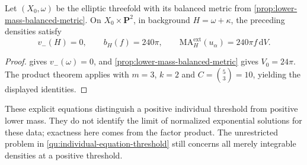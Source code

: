 \begin{corollary}\label{cor:elliptic-fivefold-exact-threshold}
Let $(X_0,\omega)$ be the elliptic threefold with its balanced metric from \cref{prop:lower-mass-balanced-metric}. On $X_0\times\mathbf P^2$, in background $H=\omega+\kappa$, the preceding densities satisfy
\[
 v_-(H)=0,\qquad b_H(f)=240\pi,
 \qquad\mathrm{MA}^{\mathrm{ext}}_H(u_\alpha)=240\pi f\,\mathrm{d}V.
\]
\end{corollary}
\begin{proof}
 gives $v_-(\omega)=0$, and \cref{prop:lower-mass-balanced-metric} gives $V_0=24\pi$. The product theorem applies with $m=3$, $k=2$ and $C=\binom53=10$, yielding the displayed identities.
\end{proof}

These explicit equations distinguish a positive individual threshold from positive lower mass. They do not identify the limit of normalized exponential solutions for these data; exactness here comes from the factor product. The unrestricted problem in \cref{qu:individual-equation-threshold} still concerns all merely integrable densities at a positive threshold.
